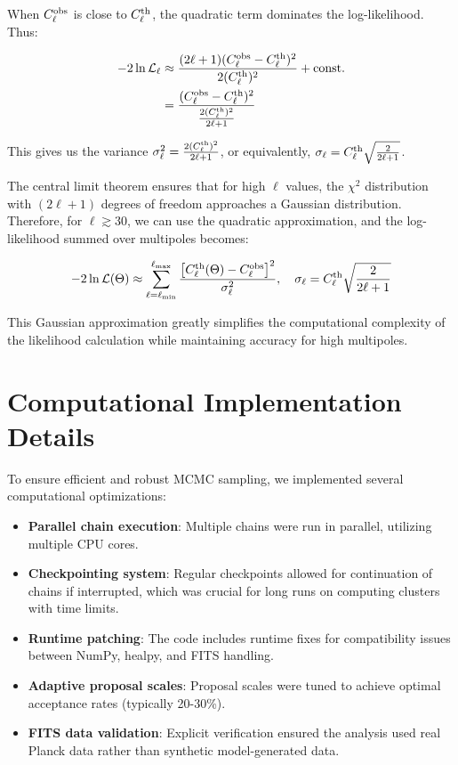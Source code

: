 \documentclass[11pt]{article}
\theoremstyle{definition}
\begin{document}
When $C_\ell^{\rm obs}$ is close to $C_\ell^{\rm th}$, the quadratic term dominates the log-likelihood. Thus:

\begin{align}
-2\ln\mathcal{L}_\ell &\approx \frac{(2\ell+1)(C_\ell^{\rm obs} - C_\ell^{\rm th})^2}{2(C_\ell^{\rm th})^2} + \text{const.} \\
&= \frac{(C_\ell^{\rm obs} - C_\ell^{\rm th})^2}{\frac{2(C_\ell^{\rm th})^2}{2\ell+1}} 
\end{align}

This gives us the variance $\sigma_\ell^2 = \frac{2(C_\ell^{\rm th})^2}{2\ell+1}$, or equivalently, $\sigma_\ell = C_\ell^{\rm th}\sqrt{\frac{2}{2\ell+1}}$.

The central limit theorem ensures that for high $\ell$ values, the $\chi^2$ distribution with $(2\ell+1)$ degrees of freedom approaches a Gaussian distribution. Therefore, for $\ell \gtrsim 30$, we can use the quadratic approximation, and the log-likelihood summed over multipoles becomes:

\begin{equation}
  -2\ln\mathcal{L}(\Theta) \approx \sum_{\ell=\ell_{\min}}^{\ell_{\max}}
    \frac{\bigl[C_\ell^{\rm th}(\Theta)-C_\ell^{\rm obs}\bigr]^2}
         {\sigma_\ell^2},
  \quad
  \sigma_\ell = C_\ell^{\rm th}\sqrt{\frac{2}{2\ell+1}}
\end{equation}

This Gaussian approximation greatly simplifies the computational complexity of the likelihood calculation while maintaining accuracy for high multipoles.

\renewcommand{\thesection}{C}
\section{Computational Implementation Details}

To ensure efficient and robust MCMC sampling, we implemented several computational optimizations:

\begin{itemize}
  \item \textbf{Parallel chain execution}: Multiple chains were run in parallel, utilizing multiple CPU cores.
  
  \item \textbf{Checkpointing system}: Regular checkpoints allowed for continuation of chains if interrupted, which was crucial for long runs on computing clusters with time limits.
  
  \item \textbf{Runtime patching}: The code includes runtime fixes for compatibility issues between NumPy, healpy, and FITS handling.
  
  \item \textbf{Adaptive proposal scales}: Proposal scales were tuned to achieve optimal acceptance rates (typically 20-30\%).
  
  \item \textbf{FITS data validation}: Explicit verification ensured the analysis used real Planck data rather than synthetic model-generated data.
\end{itemize}
\end{document}
